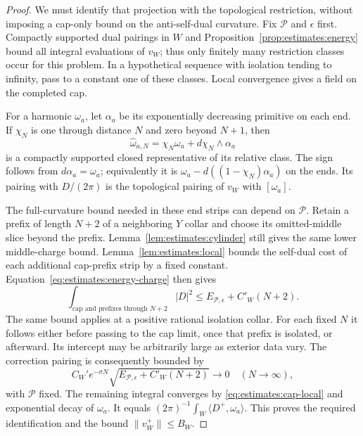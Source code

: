 \begin{proof}
We must identify that projection with the topological restriction,
without imposing a cap-only bound on the anti-self-dual curvature.
Fix $\mathcal P$ and $\epsilon$ first.  Compactly supported dual
pairings in $W$ and Proposition~\ref{prop:estimates:energy} bound all
integral evaluations of $v_W$; thus only finitely many restriction
classes occur for this problem.  In a hypothetical sequence with
isolation tending to infinity, pass to a constant one of these
classes.  Local convergence gives a field on the completed cap.

For a harmonic $\omega_a$, let $\alpha_a$ be its exponentially
decreasing primitive on each end.  If $\chi_N$ is one through
distance $N$ and zero beyond $N+1$, then
\[
             \widehat\omega_{a,N}
                =\chi_N\omega_a+d\chi_N\wedge\alpha_a
\]
is a compactly supported closed representative of its relative
class.  The sign follows from $d\alpha_a=\omega_a$; equivalently it
is $\omega_a-d((1-\chi_N)\alpha_a)$ on the ends.
Its pairing with $D/(2\pi)$ is the topological pairing of $v_W$
with $[\omega_a]$.

The full-curvature bound needed in these end strips can depend on
$\mathcal P$.  Retain a prefix of length $N+2$ of a neighboring $Y$
collar and choose its omitted-middle slice beyond the prefix.
Lemma~\ref{lem:estimates:cylinder} still gives the same lower
middle-charge bound.  Lemma~\ref{lem:estimates:local} bounds the
self-dual cost of each additional cap-prefix strip by a fixed
constant.  Equation~\eqref{eq:estimates:energy-charge} then gives
\begin{equation}
 \int_{\text{cap and prefixes through }N+2}|D|^2
            \leq E_{\mathcal P,\epsilon}+C'_W(N+2).
 \label{eq:estimates:cap-prefix}
\end{equation}
The same bound applies at a positive rational isolation collar.
For each fixed $N$ it follows either before passing to the cap
limit, once that prefix is isolated, or afterward.  Its intercept
may be arbitrarily large as exterior data vary.
The correction pairing is consequently bounded by
\begin{equation}
 C_W' e^{-\sigma N}
              \sqrt{E_{\mathcal P,\epsilon}+C'_W(N+2)}
                         \longrightarrow0
 \quad(N\longrightarrow\infty),
 \label{eq:estimates:cap-tail}
\end{equation}
with $\mathcal P$ fixed.  The remaining integral converges by
\eqref{eq:estimates:cap-local} and exponential decay of $\omega_a$.
It equals $(2\pi)^{-1}\int_W\langle D^+,\omega_a\rangle$.
This proves the required identification and the bound
$\|v_W^+\|\leq B_W$.


\end{proof}
